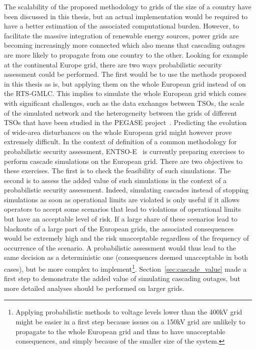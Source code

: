 The scalability of the proposed methodology to grids of the size of a country have been discussed in this thesis, but an actual implementation would be required to have a better estimation of the associated computational burden. However, to facilitate the massive integration of renewable energy sources, power grids are becoming increasingly more connected which also means that cascading outages are more likely to propagate from one country to the other. Looking for example at the continental Europe grid, there are two ways probabilistic security assessment could be performed. The first would be to use the methods proposed in this thesis as is, but applying them on the whole European grid instead of on the RTS-GMLC. This implies to simulate the whole European grid which comes with significant challenges, such as the data exchanges between TSOs, the scale of the simulated network and the heterogeneity between the grids of different TSOs that have been studied in the PEGASE project~\cite{PEGASE_project}. Predicting the evolution of wide-area disturbances on the whole European grid might however prove extremely difficult. In the context of definition of a common methodology for probabilistic security assessment, ENTSO-E~\cite{ENTSOE-PSA_second_report} is currently preparing exercises to perform cascade simulations on the European grid. There are two objectives to these exercises. The first is to check the feasibility of such simulations. The second is to assess the added value of such simulations in the context of a probabilistic security assessment. Indeed, simulating cascades instead of stopping simulations as soon as operational limits are violated is only useful if it allows operators to accept some scenarios that lead to violations of operational limits but have an acceptable level of risk. If a large share of these scenarios lead to blackouts of a large part of the European grids, the associated consequences would be extremely high and the risk unacceptable regardless of the frequency of occurrence of the scenario. A probabilistic assessment would thus lead to the same decision as a deterministic one (consequences deemed unacceptable in both cases), but be more complex to implement\footnote{Applying probabilistic methods to voltage levels lower than the 400kV grid might be easier in a first step because issues on a 150kV grid are unlikely to propagate to the whole European grid and thus to have unacceptable consequences, and simply because of the smaller size of the system.}. Section~\ref{sec:cascade_value} made a first step to demonstrate the added value of simulating cascading outages, but more detailed analyses should be performed on larger grids.

